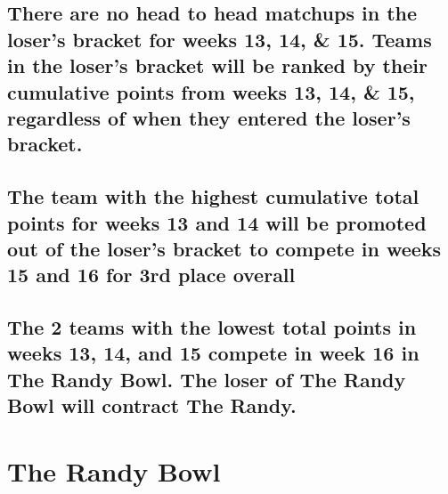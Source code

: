 \documentclass[
]{book}
\begin{document}
\hypertarget{there-are-no-head-to-head-matchups-in-the-losers-bracket-for-weeks-13-14-15.-teams-in-the-losers-bracket-will-be-ranked-by-their-cumulative-points-from-weeks-13-14-15-regardless-of-when-they-entered-the-losers-bracket.}{%
\subsection{There are no head to head matchups in the loser's bracket for weeks 13, 14, \& 15. Teams in the loser's bracket will be ranked by their cumulative points from weeks 13, 14, \& 15, regardless of when they entered the loser's bracket.}\label{there-are-no-head-to-head-matchups-in-the-losers-bracket-for-weeks-13-14-15.-teams-in-the-losers-bracket-will-be-ranked-by-their-cumulative-points-from-weeks-13-14-15-regardless-of-when-they-entered-the-losers-bracket.}}

\hypertarget{the-team-with-the-highest-cumulative-total-points-for-weeks-13-and-14-will-be-promoted-out-of-the-losers-bracket-to-compete-in-weeks-15-and-16-for-3rd-place-overall}{%
\subsection{The team with the highest cumulative total points for weeks 13 and 14 will be promoted out of the loser's bracket to compete in weeks 15 and 16 for 3rd place overall}\label{the-team-with-the-highest-cumulative-total-points-for-weeks-13-and-14-will-be-promoted-out-of-the-losers-bracket-to-compete-in-weeks-15-and-16-for-3rd-place-overall}}

\hypertarget{the-2-teams-with-the-lowest-total-points-in-weeks-13-14-and-15-compete-in-week-16-in-the-randy-bowl.-the-loser-of-the-randy-bowl-will-contract-the-randy.}{%
\subsection{The 2 teams with the lowest total points in weeks 13, 14, and 15 compete in week 16 in The Randy Bowl. The loser of The Randy Bowl will contract The Randy.}\label{the-2-teams-with-the-lowest-total-points-in-weeks-13-14-and-15-compete-in-week-16-in-the-randy-bowl.-the-loser-of-the-randy-bowl-will-contract-the-randy.}}

\hypertarget{the-randy-bowl}{%
\section{The Randy Bowl}\label{the-randy-bowl}}
\end{document}
